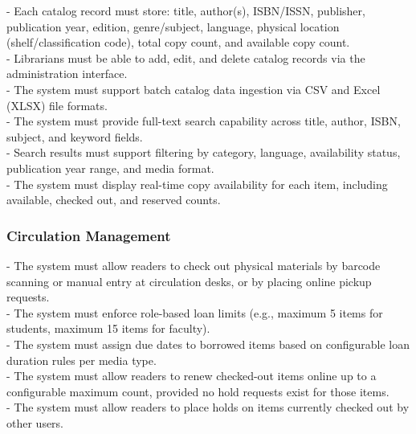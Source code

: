 - Each catalog record must store: title, author(s), ISBN/ISSN, publisher, publication year, edition, genre/subject, language, physical location (shelf/classification code), total copy count, and available copy count.\\

- Librarians must be able to add, edit, and delete catalog records via the administration interface.\\

- The system must support batch catalog data ingestion via CSV and Excel (XLSX) file formats.\\

- The system must provide full-text search capability across title, author, ISBN, subject, and keyword fields.\\

- Search results must support filtering by category, language, availability status, publication year range, and media format.\\

- The system must display real-time copy availability for each item, including available, checked out, and reserved counts.\\



\subsubsection{Circulation Management}

- The system must allow readers to check out physical materials by barcode scanning or manual entry at circulation desks, or by placing online pickup requests.\\

- The system must enforce role-based loan limits (e.g., maximum 5 items for students, maximum 15 items for faculty).\\

- The system must assign due dates to borrowed items based on configurable loan duration rules per media type.\\

- The system must allow readers to renew checked-out items online up to a configurable maximum count, provided no hold requests exist for those items.\\

- The system must allow readers to place holds on items currently checked out by other users.\\

